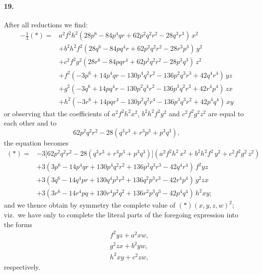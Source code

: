 \documentclass[11pt,a4paper]{article}
\begin{document}
\paragraph{19.}
After all reductions we find:
\[
\begin{aligned}
- \tfrac{1}{3} (*) = {}& a^2 f^2 h^2 (28 p^6 - 84 p^4 qr + 62 p^2 q^2 r^2 - 28 q^3 r^3) \, x^2 \\
& + b^2 h^2 f^2 (28 q^6 - 84 pq^4 r + 62 p^2 q^2 r^2 - 28 r^3 p^3) \, y^2 \\
& + c^2 f^2 g^2 (28 r^6 - 84 pqr^4 + 62 p^2 q^2 r^2 - 28 p^3 q^3) \, z^2 \\
& + f^2 (- 3 p^6 + 14 p^4 qr - 130 p^4 q^2 r^2 - 136 p^2 q^3 r^3 + 42 q^4 r^4) \, yz \\
& + g^2 (- 3 q^6 + 14 pq^4 r - 130 p^2 q^4 r^2 - 136 p^3 q^2 r^3 + 42 r^4 p^4) \, zx \\
& + h^2 (- 3 r^6 + 14 pqr^4 - 130 p^2 q^2 r^4 - 136 p^3 q^3 r^2 + 42 p^4 q^4) \, xy
\end{aligned}
\]
or observing that the coefficients of $a^2 f^2 h^2 x^2$, $b^2 h^2 f^2 y^2$ and $c^2 f^2 g^2 z^2$ are equal to each other and to
\[
62 p^2 q^2 r^2 - 28 (q^3 r^3 + r^3 p^3 + p^3 q^3),
\]
the equation becomes
\[
\begin{aligned}
(*) = {}& -3 \bigl[ 62 p^2 q^2 r^2 - 28 (q^3 r^3 + r^3 p^3 + p^3 q^3) \bigr]
   (a^2 f^2 h^2 \, x^2 + b^2 h^2 f^2 \, y^2 + c^2 f^2 g^2 \, z^2) \\
& + 3 (3 p^6 - 14 p^4 qr + 130 p^4 q^2 r^2 + 136 p^2 q^3 r^3 - 42 q^4 r^4) \, f^2 yz \\
& + 3 (3 q^6 - 14 q^4 pr + 130 q^4 p^2 r^2 + 136 q^2 p^3 r^3 - 42 r^4 p^4) \, g^2 zx \\
& + 3 (3 r^6 - 14 r^4 pq + 130 r^4 p^2 q^2 + 136 r^2 p^3 q^3 - 42 p^4 q^4) \, h^2 xy;
\end{aligned}
\]
and we thence obtain by symmetry the complete value of $(*)(x, y, z, w)^2$; viz.\ we have
only to complete the literal parts of the foregoing expression into the forms
\[
\begin{aligned}
& f^2 yz + a^2 xw,\\
& g^2 zx + b^2 yw,\\
& h^2 xy + c^2 zw,
\end{aligned}
\]
respectively.
\end{document}
